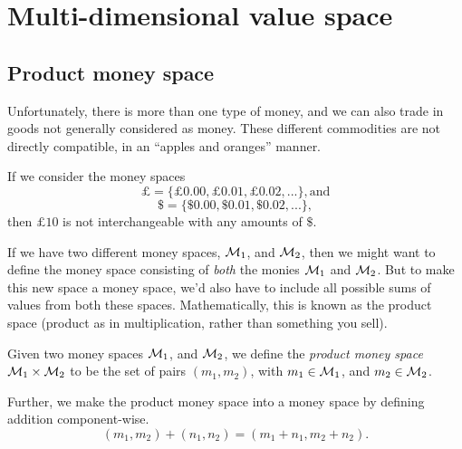 \section{Multi-dimensional value space}

\subsection{Product money space}

Unfortunately, there is more than one type of money, and we can also trade in goods not generally considered as money.
These different commodities are not directly compatible, in an ``apples and oranges'' manner.

\begin{example}
    If we consider the money spaces
    \begin{equation*}
        \pounds = \{ \pounds 0.00, \pounds 0.01, \pounds 0.02, ... \}, \text{and}
    \end{equation*}
    \begin{equation*}
        \$ = \{ \$ 0.00, \$ 0.01, \$ 0.02, ... \},
    \end{equation*}
    then $\pounds 10$ is not interchangeable with any amounts of $\$$.\footnotemark
\end{example}

If we have two different money spaces, $\mathcal{M}_1$, and $\mathcal{M}_2$,
then we might want to define the money space consisting of \emph{both} the monies $\mathcal{M}_1$ and $\mathcal{M}_2$.
But to make this new space a money space, we'd also have to include all possible sums of values from both these spaces.
Mathematically, this is known as the product space (product as in multiplication, rather than something you sell).

\begin{definition}
    Given two money spaces $\mathcal{M}_1$, and $\mathcal{M}_2$, we define the \emph{product money space} $\mathcal{M}_1 \times \mathcal{M}_2$ to be the set of pairs $(m_1, m_2)$,
    with $m_1 \in \mathcal{M}_1$, and $m_2 \in \mathcal{M}_2$.

    Further, we make the product money space into a money space by defining addition component-wise.
    \begin{equation*}
        (m_1, m_2) + (n_1, n_2) = (m_1 + n_1, m_2 + n_2).
    \end{equation*}
\end{definition}

